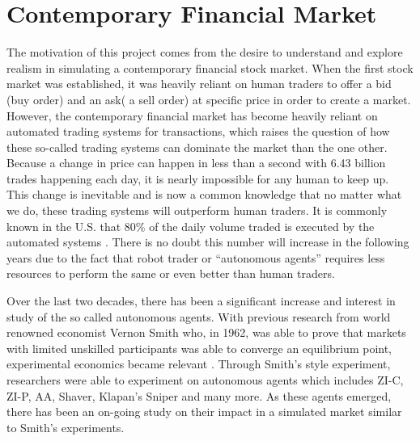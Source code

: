 
\graphicspath{ {./images/} }



% 

\section{Contemporary Financial Market} 
The motivation of this project comes from the desire to understand and explore realism in simulating a contemporary financial stock market. When the first stock market was established, it was heavily reliant on human traders to offer a bid (buy order) and an ask( a sell order) at specific price in order to create a market. However, the contemporary financial market has become heavily reliant on automated trading systems for transactions, which raises the question of how these so-called trading systems can dominate the market than the one other. Because a change in price can happen in less than a second with 6.43 billion trades happening each day, it is nearly impossible for any human to keep up\cite{dailytrade}. This change is inevitable and is now a common knowledge that no matter what we do, these trading systems will outperform human traders. It is commonly known in the U.S. that 80\% of the daily volume traded is executed by the automated systems \cite{percentAgent}. There is no doubt this number will increase in the following years due to the fact that robot trader or ``autonomous agents” requires less resources to perform the same or even better than human traders. 

Over the last two decades, there has been a significant increase and interest in study of the so called autonomous agents. With previous research from world renowned economist Vernon Smith who, in 1962, was able to prove that markets with limited unskilled participants was able to converge an equilibrium point, experimental economics became relevant \cite{smith1962}. Through Smith’s style experiment, researchers were able to experiment on autonomous agents which includes ZI-C, ZI-P, AA, Shaver, Klapan’s Sniper and many more. As these agents emerged, there has been an on-going study on their impact in a simulated market similar to Smith's experiments.  

